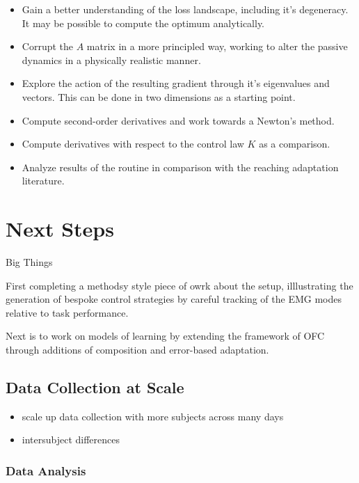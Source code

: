 \documentclass[
  a4paper,
]{article}
\providecommand{\tightlist}{%
  \setlength{\itemsep}{0pt}\setlength{\parskip}{0pt}}
\begin{document}
\begin{itemize}
\tightlist
\item
  Gain a better understanding of the loss landscape, including it's
  degeneracy. It may be possible to compute the optimum analytically.
\item
  Corrupt the \(A\) matrix in a more principled way, working to alter
  the passive dynamics in a physically realistic manner.
\item
  Explore the action of the resulting gradient through it's eigenvalues
  and vectors. This can be done in two dimensions as a starting point.
\item
  Compute second-order derivatives and work towards a Newton's method.
\item
  Compute derivatives with respect to the control law \(K\) as a
  comparison.
\item
  Analyze results of the routine in comparison with the reaching
  adaptation literature.
\end{itemize}

\hypertarget{next-steps}{%
\section{Next Steps}\label{next-steps}}

Big Things

First completing a methodsy style piece of owrk about the setup,
illlustrating the generation of bespoke control strategies by careful
tracking of the EMG modes relative to task performance.

Next is to work on models of learning by extending the framework of OFC
through additions of composition and error-based adaptation.

\hypertarget{data-collection-at-scale}{%
\subsection{Data Collection at Scale}\label{data-collection-at-scale}}

\begin{itemize}
\tightlist
\item
  scale up data collection with more subjects across many days
\item
  intersubject differences
\end{itemize}

\hypertarget{data-analysis}{%
\subsubsection{Data Analysis}\label{data-analysis}}
\end{document}
